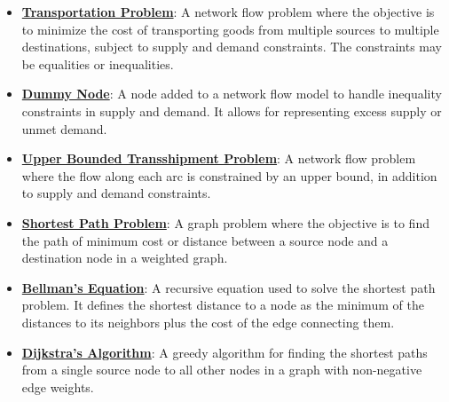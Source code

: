 \documentclass{article}%
\begin{document}
\begin{itemize}[leftmargin=*]%
\item \href{https://www.math.purdue.edu/~yipn/421//2024-11-14-NetAppls.pdf#page=1}{\textbf{Transportation Problem}}: A network flow problem where the objective is to minimize the cost of transporting goods from multiple sources to multiple destinations, subject to supply and demand constraints. The constraints may be equalities or inequalities.%
\item \href{https://www.math.purdue.edu/~yipn/421//2024-11-14-NetAppls.pdf#page=3}{\textbf{Dummy Node}}: A node added to a network flow model to handle inequality constraints in supply and demand.  It allows for representing excess supply or unmet demand.%
\item \href{https://www.math.purdue.edu/~yipn/421//2024-11-14-NetAppls.pdf#page=9}{\textbf{Upper Bounded Transshipment Problem}}: A network flow problem where the flow along each arc is constrained by an upper bound, in addition to supply and demand constraints.%
\item \href{https://www.math.purdue.edu/~yipn/421//2024-11-14-NetAppls.pdf#page=13}{\textbf{Shortest Path Problem}}: A graph problem where the objective is to find the path of minimum cost or distance between a source node and a destination node in a weighted graph.%
\item \href{https://www.math.purdue.edu/~yipn/421//2024-11-14-NetAppls.pdf#page=16}{\textbf{Bellman's Equation}}: A recursive equation used to solve the shortest path problem. It defines the shortest distance to a node as the minimum of the distances to its neighbors plus the cost of the edge connecting them.%
\item \href{https://www.math.purdue.edu/~yipn/421//2024-11-14-NetAppls.pdf#page=20}{\textbf{Dijkstra's Algorithm}}: A greedy algorithm for finding the shortest paths from a single source node to all other nodes in a graph with non-negative edge weights.%
\end{itemize}%
\end{document}
